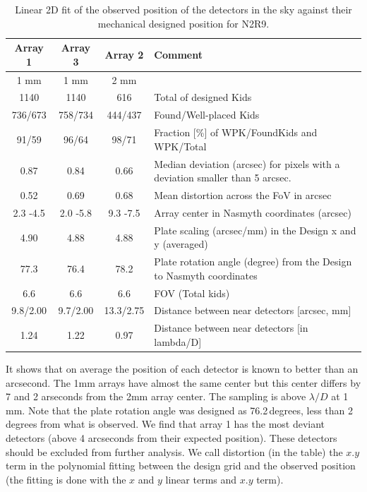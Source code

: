 \begin{table}[ht]
\label{ta:gridmatch}
\begin{center}
\begin{tabular}{|c|c|c|l|}
\hline
Array 1  &	Array 3   &	Array 2   &	Comment \\
\hline
1 mm      &       1 mm     &        2 mm  & \\
1140 	 &      1140 	   &        616  &	Total of designed Kids \\
736/673  &	758/734  &	444/437  &	Found/Well-placed Kids \\
91/59 	 &    96/64 	 &      98/71 	 & Fraction [\%] of WPK/FoundKids and WPK/Total \\
0.87 	 &     0.84 	  & 0.66     &	Median deviation (arcsec) for pixels with a deviation smaller than 5 arcsec. \\
0.52 	 &     0.69 	 &        0.68 	 & Mean distortion across the FoV in arcsec \\
2.3 -4.5  &	2.0 -5.8  &	9.3 -7.5  &	Array center in Nasmyth coordinates (arcsec) \\
4.90  &	4.88  &	4.88  &	Plate scaling (arcsec/mm) in the Design x and y (averaged) \\
77.3  &	76.4  &	78.2  &	Plate rotation angle (degree) from the Design to Nasmyth coordinates \\
6.6  &	6.6  &	6.6  &	FOV (Total kids) \\
9.8/2.00  &	9.7/2.00  &	13.3/2.75  &	Distance between near detectors [arcsec, mm] \\
1.24  &	1.22  &	0.97  &	Distance between near detectors [in lambda/D] \\
\hline
\end{tabular}
\end{center}
\caption[Field-of-view deformations]{Linear 2D fit of the observed position of the detectors in the sky
  against their mechanical designed position for N2R9. }
\end{table}

It shows that on average the position of each detector is known to better than
an arcsecond. The 1mm arrays have almost the same center but this center
differs by 7 and 2 arseconds from the 2mm array center. The sampling is above
$\lambda/D$ at 1 mm. Note that the plate rotation angle was designed as
76.2\,degrees, less than 2 degrees from what is observed. We find that array 1
has the most deviant detectors (above 4 arcseconds from their expected
position). These detectors should be excluded from further analysis. We call
distortion (in the table) the $x.y$ term in the polynomial fitting between the
design grid and the observed position (the fitting is done with the $x$ and
$y$ linear terms and $x.y$ term). 



